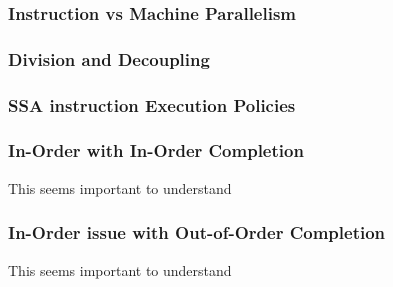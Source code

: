 \subsubsection{Instruction vs Machine Parallelism}
\subsubsection{Division and Decoupling}
\subsubsection{SSA instruction Execution Policies}
\subsubsection{In-Order with In-Order Completion}
This seems important to understand
\subsubsection{In-Order issue with Out-of-Order Completion}
This seems important to understand
